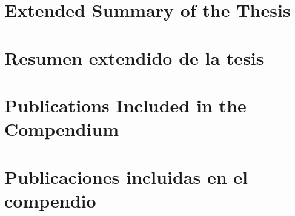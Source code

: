 %

  {\part{Extended Summary of the Thesis}}
  {\part{Resumen extendido de la tesis}}
\label{part:compendium-summary}










  {\part{Publications Included in the Compendium}}
  {\part{Publicaciones incluidas en el compendio}}
\label{part:compendium-publications}









